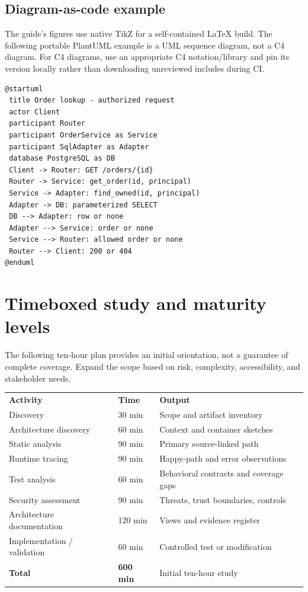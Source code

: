 \documentclass[11pt,letterpaper]{article}
\begin{document}
\subsection{Diagram-as-code example}
The guide's figures use native TikZ for a self-contained LaTeX build. The following portable PlantUML example is a UML sequence diagram, not a C4 diagram. For C4 diagrams, use an appropriate C4 notation/library and pin its version locally rather than downloading unreviewed includes during CI.
\begin{lstlisting}
@startuml
 title Order lookup - authorized request
 actor Client
 participant Router
 participant OrderService as Service
 participant SqlAdapter as Adapter
 database PostgreSQL as DB
 Client -> Router: GET /orders/{id}
 Router -> Service: get_order(id, principal)
 Service -> Adapter: find_owned(id, principal)
 Adapter -> DB: parameterized SELECT
 DB --> Adapter: row or none
 Adapter --> Service: order or none
 Service --> Router: allowed order or none
 Router --> Client: 200 or 404
@enduml
\end{lstlisting}
\clearpage
\section{Timeboxed study and maturity levels}
The following ten-hour plan provides an initial orientation, not a guarantee of complete coverage. Expand the scope based on risk, complexity, accessibility, and stakeholder needs.

\noindent\begin{tabularx}{\linewidth}{@{}P{2.1in}P{0.75in}Y@{}}
\color{white}\textbf{Activity}&\color{white}\textbf{Time}&\color{white}\textbf{Output}\\
Discovery & 30 min & Scope and artifact inventory\\
Architecture discovery & 60 min & Context and container sketches\\
Static analysis & 90 min & Primary source-linked path\\
Runtime tracing & 90 min & Happy-path and error observations\\
Test analysis & 60 min & Behavioral contracts and coverage gaps\\
Security assessment & 90 min & Threats, trust boundaries, controls\\
Architecture documentation & 120 min & Views and evidence register\\
Implementation / validation & 60 min & Controlled test or modification\\
\midrule
\textbf{Total} & \textbf{600 min} & Initial ten-hour study\\
\bottomrule
\end{tabularx}
\end{document}
